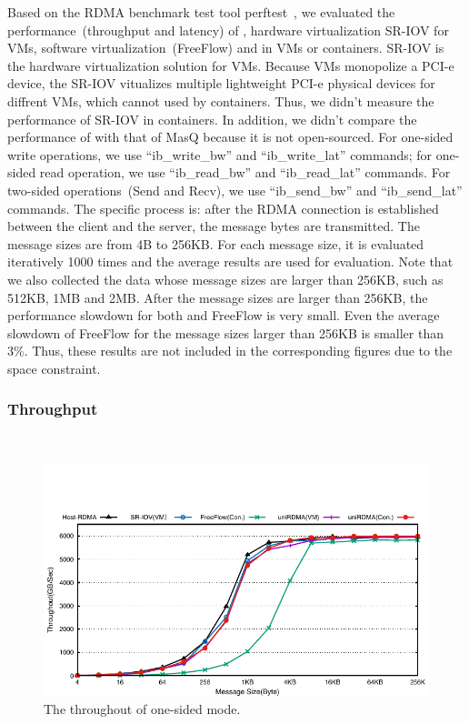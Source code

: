 Based on the RDMA benchmark test tool perftest~\cite{perftest}, we evaluated the performance~(throughput and latency) of \native, hardware virtualization SR-IOV for VMs,  software virtualization~(FreeFlow) and \sys in VMs or containers. SR-IOV is the hardware virtualization solution for VMs. Because VMs monopolize a PCI-e device, the SR-IOV vitualizes multiple lightweight PCI-e physical devices for diffrent VMs, which cannot used by containers. Thus, we didn't measure the performance of SR-IOV in containers. In addition, we didn't compare the performance of \sys with that of MasQ because it is not open-sourced. For one-sided write operations, we use ``ib\_write\_bw'' and ``ib\_write\_lat'' commands; for one-sided read operation, we use ``ib\_read\_bw'' and ``ib\_read\_lat'' commands. For two-sided operations~(Send and Recv), we use ``ib\_send\_bw'' and ``ib\_send\_lat'' commands. The specific process is: after the RDMA connection is established between the client and the server, the message bytes are transmitted. The message sizes are from 4B to 256KB. For each message size,  it is evaluated iteratively 1000 times and the average results are used for evaluation.  Note that we also collected the data whose message sizes are larger than 256KB, such as 512KB, 1MB and 2MB. After the message sizes are larger than 256KB, the performance slowdown for both \sys and FreeFlow is very small. Even the average slowdown of FreeFlow for the message sizes larger than 256KB is smaller than 3\%. Thus, these results are not included in the corresponding figures due to the space constraint. 


\subsubsection{\textbf{Throughput}}
\
\noindent

\begin{figure}[!ht]
	\centering
	\includegraphics[width=1.00\linewidth]{images/write-bw.pdf}
	\caption{The throughout of one-sided mode.}
	\label{fig:write-bw}
\end{figure}


